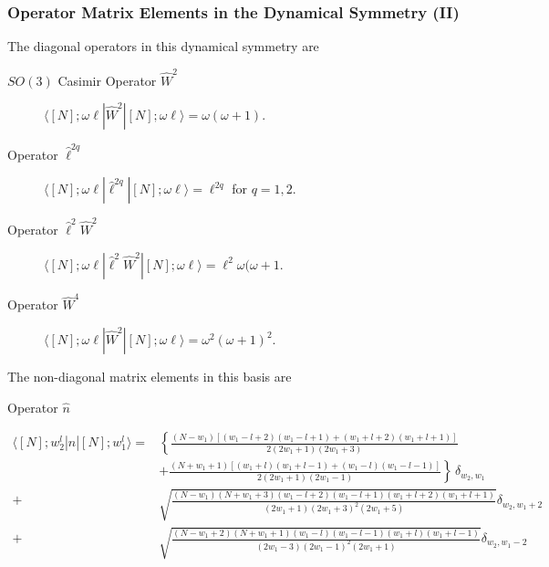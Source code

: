 \documentclass[a4paper,12pt,captions=tableheading]{article}
\begin{document}
\subsubsection{Operator Matrix Elements in the Dynamical Symmetry (II)}
\label{sec-2-3-2}


The diagonal operators in this dynamical symmetry are

\begin{description}
\item[{\(SO(3)\) Casimir Operator \(\hat W^2\)}] \(\langle [N];\omega \ell|\hat W^2|[N]; \omega \ell\rangle = \omega(\omega + 1)\).

\item[{Operator \(\hat \ell^{2q}\)}] \(\langle [N];\omega \ell|\hat \ell^{2q}|[N];\omega \ell\rangle = \ell^{2q}\) for \(q = 1,2\).

\item[{Operator \(\hat \ell^2 \hat W^2\)}] \(\langle [N];\omega \ell|\hat \ell^2 \hat W^2|[N]; \omega \ell\rangle = \ell^2 \omega(\omega + 1\).

\item[{Operator \(\hat W^4\)}] \(\langle [N];\omega \ell|\hat W^2|[N]; \omega \ell\rangle = \omega^2(\omega + 1)^2\).
\end{description}

The non-diagonal matrix elements in this basis are 
\begin{description}
\item[{Operator \(\hat n\)}] 
\end{description}

\begin{align}
  \langle [N];w_2^l|\hat n|[N];w_1^l\rangle =&
  \left\{\frac{(N-w_1)\left[(w_1-l+2)(w_1-l+1) +
        (w_1+l+2)(w_1+l+1)\right]}{2(2w_1+1)(2w_1+3)} \right. \nonumber\\
  & + \left.\frac{(N+w_1+1)\left[(w_1+l)(w_1+l-1) +
        (w_1-l)(w_1-l-1)\right]}{2(2w_1+1)(2w_1-1)} \right\}\,
  \delta_{w_2,w_1} \label{nmatel_so3}\\
+& \sqrt{\frac{(N-w_1)(N+w_1+3)(w_1-l+2)(w_1-l+1)(w_1+l+2)(w_1+l+1)}{(2w_1+1)(2w_1+3)^2(2w_1+5)}}\delta_{w_2,w_1+2}\nonumber\\
+& \sqrt{\frac{(N-w_1+2)(N+w_1+1)(w_1-l)(w_1-l-1)(w_1+l)(w_1+l-1)}{(2w_1-3)(2w_1-1)^2(2w_1+1)}}\delta_{w_2,w_1-2}\nonumber\\
\end{align}
\end{document}
